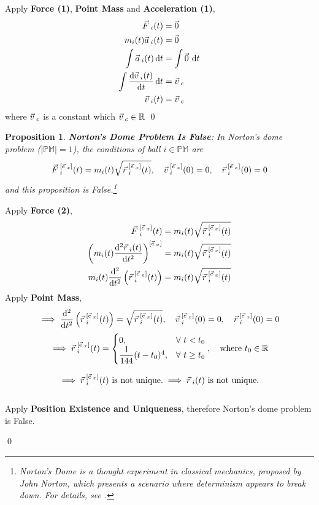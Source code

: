 \documentclass[12pt]{amsart}
\newtheorem{proposition}[theorem]{Proposition}
\renewenvironment{proof}{{\bfseries Proof.}}{\qed}
\let\oldvec\vec
\renewcommand{\vec}[1]{\oldvec{#1}\hspace{0.1em}}
\begin{document}
\begin{proof}
    Apply \textbf{Force (1)}, \textbf{Point Mass} and \textbf{Acceleration (1)},
    \begin{align*}
        \vec{F}_{i}(t) &= \vec{0} \\
        m_i(t) \vec{a}_i(t) &= \vec{0} \\
        \int \vec{a}_i(t) \, \mathrm{d} t &= \int \vec{0} \, \mathrm{d} t \\
        \int \dfrac{\mathrm{d} \vec{v}_{i} (t)}{\mathrm{d} t} \, \mathrm{d} t &= \vec{v}_c \\
        \vec{v}_i(t) &= \vec{v}_c
    \end{align*}
    where $\vec{v}_c$ is a constant which $\vec{v}_c \in \mathbb{R}$
\end{proof}

\begin{proposition}
    \textbf{Norton's Dome Problem Is False}: In Norton's dome problem ($\left |\mathbb{PM}\right | = 1$), the conditions of ball $i \in \mathbb{PM}$ are 
    $$ \vec{F}_i^{[\vec{e}_x]}(t) = m_i(t) \sqrt{\vec{r}_i^{[\vec{e}_x]}(t)} , \quad \vec{v}_i^{[\vec{e}_x]}(0) = 0, \quad \vec{r}_i^{[\vec{e}_x]}(0) = 0$$
    and this proposition is False.\footnote{Norton's Dome is a thought experiment in classical mechanics, proposed by John Norton, which presents a scenario where determinism appears to break down. For details, see \cite{norton2008dome}.}
\end{proposition}

\begin{proof}
    Apply \textbf{Force (2)},
    \begin{align*}
    \vec{F}_i^{[\vec{e}_x]}(t) &= m_i(t)\sqrt{\vec{r}_i^{[\vec{e}_x]}(t)} \\
    \left ( m_i(t) \dfrac{\mathrm{d}^2 \vec{r}_{i} (t)}{\mathrm{d} t^2} \right )^{[\vec{e}_x]} &= m_i(t)\sqrt{\vec{r}_i^{[\vec{e}_x]}(t)}\\
     m_i(t) \dfrac{\mathrm{d}^2 }{\mathrm{d} t^2} \left ( \vec{r}^{[\vec{e}_x]}_{i} (t) \right ) &= m_i(t)\sqrt{\vec{r}_i^{[\vec{e}_x]}(t)}
    \end{align*}
    Apply \textbf{Point Mass},
    $$
    \implies \dfrac{\mathrm{d}^2 }{\mathrm{d} t^2} \left ( \vec{r}^{[\vec{e}_x]}_{i} (t) \right ) = \sqrt{\vec{r}_i^{[\vec{e}_x]}(t)}, \quad \vec{v}_i^{[\vec{e}_x]}(0) = 0, \quad \vec{r}_i^{[\vec{e}_x]}(0) = 0 
    $$
    $$
    \implies \vec{r}^{[\vec{e}_x]}_{i}(t) = \begin{cases} 0, & \forall \ t<t_0 \\ \dfrac{1}{144}(t - t_0)^4, & \forall \ t \geq t_0 \end{cases}, \quad \text{where } t_0 \in \mathbb{R}
    $$
    
    $$
    \implies \vec{r}^{[\vec{e}_x]}_{i}(t) \text{ is not unique.} \implies \vec{r}_{i}(t) \text{ is not unique.} 
    $$
    \\
    Apply \textbf{Position Existence and Uniqueness}, therefore Norton's dome problem is False.
    
\end{proof}
\end{document}
